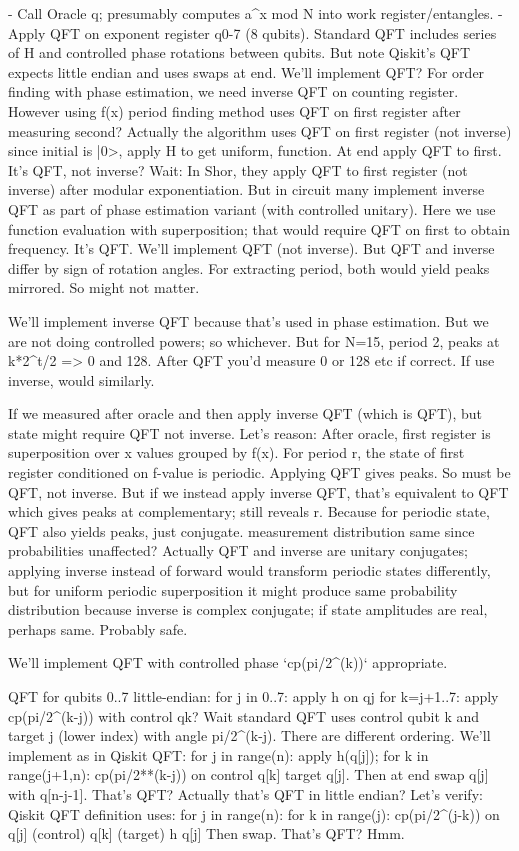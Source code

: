 \begin{decodedreasoningpanel}
- Call Oracle q; presumably computes a\textasciicircum{}x mod N into work register/entangles.
- Apply QFT on exponent register q0-7 (8 qubits). Standard QFT includes series of H and controlled phase rotations between qubits. But note Qiskit's QFT expects little endian and uses swaps at end. We'll implement QFT? For order finding with phase estimation, we need inverse QFT on counting register. However using f(x) period finding method uses QFT on first register after measuring second? Actually the algorithm uses QFT on first register (not inverse) since initial is |0>, apply H to get uniform, function. At end apply QFT to first. It's QFT, not inverse? Wait: In Shor, they apply QFT to first register (not inverse) after modular exponentiation. But in circuit many implement inverse QFT as part of phase estimation variant (with controlled unitary). Here we use function evaluation with superposition; that would require QFT on first to obtain frequency. It's QFT. We'll implement QFT (not inverse). But QFT and inverse differ by sign of rotation angles. For extracting period, both would yield peaks mirrored. So might not matter.

We'll implement inverse QFT because that's used in phase estimation. But we are not doing controlled powers; so whichever. But for N=15, period 2, peaks at k*2\textasciicircum{}t/2 => 0 and 128. After QFT you'd measure 0 or 128 etc if correct. If use inverse, would similarly.

If we measured after oracle and then apply inverse QFT (which is QFT), but state might require QFT not inverse. Let's reason: After oracle, first register is superposition over x values grouped by f(x). For period r, the state of first register conditioned on f-value is periodic. Applying QFT gives peaks. So must be QFT, not inverse. But if we instead apply inverse QFT, that's equivalent to QFT which gives peaks at complementary; still reveals r. Because for periodic state, QFT also yields peaks, just conjugate. measurement distribution same since probabilities unaffected? Actually QFT and inverse are unitary conjugates; applying inverse instead of forward would transform periodic states differently, but for uniform periodic superposition it might produce same probability distribution because inverse is complex conjugate; if state amplitudes are real, perhaps same. Probably safe.

We'll implement QFT with controlled phase `cp(pi/2\textasciicircum{}(k))` appropriate.

QFT for qubits 0..7 little-endian:
for j in 0..7:
 apply h on qj
 for k=j+1..7:
  apply cp(pi/2\textasciicircum{}(k-j)) with control qk? Wait standard QFT uses control qubit k and target j (lower index) with angle pi/2\textasciicircum{}(k-j). There are different ordering. We'll implement as in Qiskit QFT: for j in range(n): apply h(q[j]); for k in range(j+1,n): cp(pi/2**(k-j)) on control q[k] target q[j]. Then at end swap q[j] with q[n-j-1]. That's QFT? Actually that's QFT in little endian? Let's verify: Qiskit QFT definition uses:
for j in range(n):
 for k in range(j):
  cp(pi/2\textasciicircum{}(j-k)) on q[j] (control) q[k] (target)
 h q[j]
Then swap. That's QFT? Hmm.


\end{decodedreasoningpanel}
